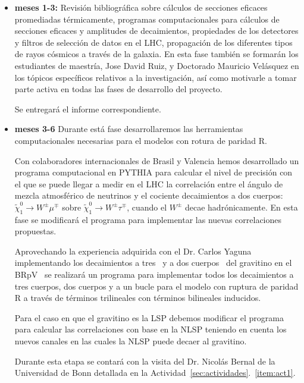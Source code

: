 \begin{itemize}
\item \textbf{meses 1-3:} Revisión bibliográfica sobre cálculos de
  secciones eficaces promediadas térmicamente, programas
  computacionales para cálculos de secciones eficaces y amplitudes de
  decaimientos, propiedades de los detectores y filtros de selección
  de datos en el LHC, propagación de los diferentes tipos de rayos
  cósmicos a través de la galaxia.  En esta fase también se formarán los
  estudiantes  de maestría, Jose David Ruiz, y Doctorado Mauricio
  Velásquez en los tópicos específicos relativos a la
  investigación, así como motivarle a tomar parte activa en todas las
  fases de desarrollo del proyecto.

  Se entregará el informe correspondiente.
\item \textbf{meses 3-6} Durante está fase desarrollaremos las
  herramientas computacionales necesarias para el modelos con rotura
  de paridad R.

\begin{brpvlhc}
  Con colaboradores internacionales de Brasil y Valencia hemos desarrollado un
  programa computacional en PYTHIA para calcular el nivel de precisión
  con el que se puede llegar a medir en el LHC la correlación entre el
  ángulo de mezcla atmosférico de neutrinos y el cociente decaimientos
  a dos cuerpos: $\tilde\chi_1^0\to W^\pm\mu^\mp$ sobre
  $\tilde\chi_1^0\to W^\pm\tau^\mp$, cuando el $W^\pm$ decae
  hadrónicamente.  En esta fase se modificará el programa para
  implementar las nuevas correlaciones propuestas.
\end{brpvlhc}

\begin{gravitinodm}
  Aprovechando la experiencia adquirida con el Dr. Carlos Yaguna
  implementando los decaimientos a tres~\cite{Choi:2010xn,Choi:2010jt}
  y a dos cuerpos~\cite{Restrepo:2011rj} del gravitino en el
  BRpV~\cite{Choi:2010xn,Choi:2010jt} se realizará un programa para
  implementar todos los decaimientos a tres cuerpos, dos cuerpos y a
  un bucle para el modelo con ruptura de paridad R a través de
  términos trilineales con términos bilineales inducidos.

  Para el caso en que el gravitino es la LSP debemos modificar el
  programa para calcular las correlaciones con base en la NLSP
  teniendo en cuenta los nuevos canales en las cuales la NLSP puede
  decaer al gravitino.

  Durante esta etapa se contará con la visita del Dr. Nicolás Bernal
  de la Universidad de Bonn detallada en la
  Actividad~\ref{sec:actividades}.~\ref{item:act1}. 


\end{gravitinodm}
\end{itemize}
